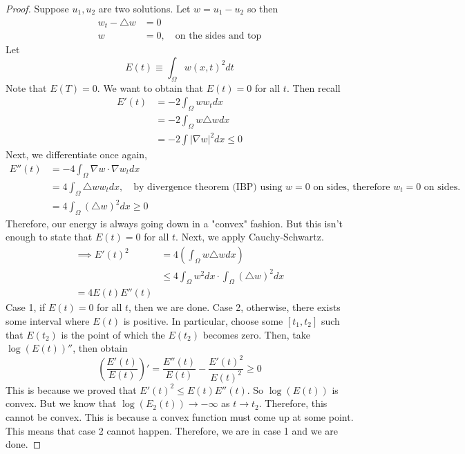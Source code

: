 \documentclass{article}
\newtheorem{one minute paper}[theorem]{One Minute Paper}
\begin{document}
\begin{proof}
    Suppose $u_1,u_2$ are two solutions. Let $w = u_1 - u_2$ so then 
    \begin{align*}
        w_t - \triangle w &= 0\\
        w &= 0, \quad \text{on the sides and top}
    \end{align*}
    Let 
    \begin{equation}
        E(t) \equiv \int_{\Omega}w(x,t)^2dt
    \end{equation}
    Note that $E(T) = 0$. We want to obtain that $E(t) =0 $ for all $t$. Then recall 
    \begin{align*}
        E'(t) &= -2\int_{\Omega}ww_t dx \\
        &= -2\int_{\Omega}w\triangle w dx \\
        &= -2 \int |\nabla w|^2 dx \leq 0
    \end{align*}
    Next, we differentiate once again, 
    \begin{align*}
        E''(t) &= -4\int_{\Omega}\nabla w \cdot \nabla w_t dx \\
        &= 4 \int_{\Omega}\triangle w w_t dx, \quad \text{by divergence theorem (IBP) using $w=0$ on sides, therefore $w_t =0$ on sides.} \\
        &= 4\int_{\Omega}(\triangle w)^2 dx \geq 0
    \end{align*}
    Therefore, our energy is always going down in a "convex" fashion. But this isn't enough to state that $E(t) =0$ for all $t$. 
    Next, we apply Cauchy-Schwartz. 
    \begin{align*}
        \implies E'(t)^2 &= 4 \left( \int_{\Omega}w \triangle w dx \right) \\
        &\leq 4 \int_{\Omega}w^2 dx \cdot \int_{\Omega}(\triangle w)^2 dx \\
        = 4E(t)E''(t)
    \end{align*}
    Case 1, if $E(t) = 0$ for all $t$, then we are done. Case 2, otherwise, there exists some interval where $E(t)$ is positive. In particular, choose some $[t_1,t_2]$ such that $E(t_2)$ is the point of which the $E(t_2)$ becomes zero.
    Then, take $\log(E(t))''$, then obtain 
    \begin{equation}
        \left( \frac{E'(t)}{E(t)} \right)' = \frac{E''(t)}{E(t)} - \frac{E'(t)^2}{E(t)^2} \geq 0
    \end{equation}
    This is because we proved that $E'(t)^2 \leq E(t)E''(t)$. So $\log(E(t))$ is convex. But we know that $\log(E_2(t)) \rightarrow -\infty$ as $t \rightarrow t_2$. Therefore, this cannot be convex. This is because a convex function must come up at some point. 
    This means that case 2 cannot happen. Therefore, we are in case 1 and we are done.
\end{proof}
\end{document}

